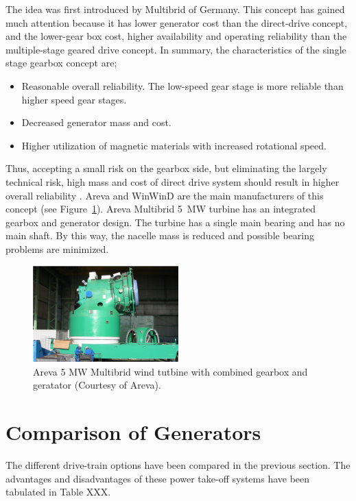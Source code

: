 \documentclass[a4paper, 11pt]{article} %
\begin{document}
The idea was first introduced by Multibrid of Germany. This concept has gained much attention because it has lower generator cost than the direct-drive concept, and the lower-gear box cost, higher availability and operating reliability than the multiple-stage geared drive concept. In summary, the characteristics of the single stage gearbox concept are;

\begin{itemize}
	\item Reasonable overall reliability. The low-speed gear stage is more reliable than higher speed gear stages.
	\item Decreased generator mass and cost.
	\item Higher utilization of magnetic materials with increased rotational speed.
\end{itemize}

Thus, accepting a small risk on the gearbox side, but eliminating the largely technical risk, high mass and cost of direct drive system should result in higher overall reliability \cite{Bohmeke2003}. Areva and WinWinD are the main manufacturers of this concept (see Figure~\ref{multibrid}). Areva Multibrid 5~MW turbine has an integrated gearbox and generator design. The turbine has a single main bearing and has no main shaft. By this way, the nacelle mass is reduced and possible bearing problems are minimized. 

  \begin{figure}
    \centering
    \includegraphics[width=0.5\textwidth]{multibrid}
    \caption{Areva 5 MW Multibrid wind tutbine with combined gearbox and geratator (Courtesy of Areva).} 
    \label{multibrid}
  \end{figure}

\section{Comparison of Generators}

The different drive-train options have been compared in the previous section. The advantages and disadvantages of these power take-off systems have been tabulated in Table XXX.
\end{document}
